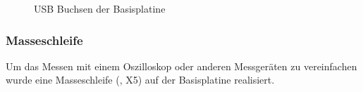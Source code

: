\begin{figure}[htb]
    \centering
    \qquad
    \qquad
    \caption[USB Buchsen der Basisplatine]{USB Buchsen der \gls{Basisplatine}}
    \label{fig:basisplatine-usb}
\end{figure}

\subsubsection{Masseschleife}
Um das Messen mit einem Oszilloskop oder anderen Messgeräten zu vereinfachen wurde eine Masseschleife (, X5) auf der \gls{Basisplatine} realisiert.

